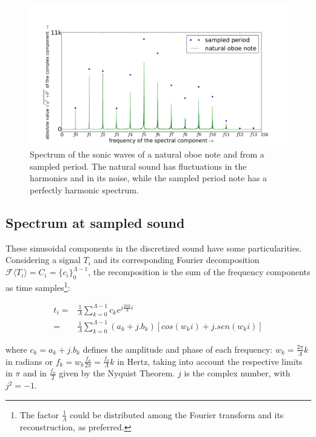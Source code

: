 \begin{figure}
    \centering
        \includegraphics[width=.7\textwidth]{figures/oboeNaturalSampledSpectrum}
    \caption{Spectrum of the sonic waves of a natural oboe note and from a sampled period. The natural sound has fluctuations in the harmonics and in its noise, while the sampled period note has a perfectly harmonic spectrum.}
        \label{fig:espectroOboe}
\end{figure}


\subsection{Spectrum at sampled sound}

These sinusoidal components in the discretized sound have some particularities. Considering a signal $T_i$ and its corresponding Fourier decomposition $\mathcal{F}\langle T_i\rangle=C_i=\{c_i\}_0^{\Lambda-1}$, the recomposition is the sum of the frequency components as time samples\footnote{The factor $\frac{1}{\Lambda}$ could be distributed among the Fourier transform and its reconstruction, as preferred.}:

\begin{equation}\label{recomposicaoFourier}
\begin{split}
t_i = & \frac{1}{\Lambda}\sum_{k=0}^{\Lambda-1}c_ke^{j \frac{2\pi k}{\Lambda} i } \\ 
    = & \frac{1}{\Lambda}\sum_{k=0}^{\Lambda-1}(a_k+ j . b_k)\left[cos(w_k i)   +j . sen(w_k i)\right]
\end{split}
\end{equation}

where $c_k = a_k + j . b_k$ defines the amplitude and phase of each frequency: $w_k=\frac{2\pi}{\Lambda}k$ in radians or $f_k=w_k\frac{f_a}{2\pi}=\frac{f_a}{\Lambda}k$ in Hertz, taking into account the respective limits in $\pi$ and in $\frac{f_a}{2}$ given by the Nyquist Theorem. $j$ is the complex number, with $j^2=-1$.

